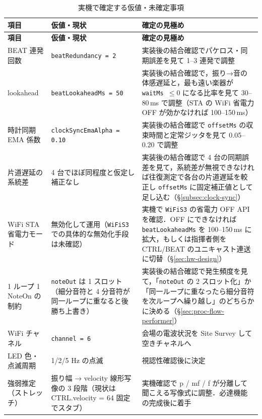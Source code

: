 \documentclass[lualatex,book,paper=a4paper,jafontsize=11.5pt,jafontscale=1.05]{jlreq}
\begin{document}
\begin{longtable}{L{0.18\textwidth} L{0.34\textwidth} L{0.40\textwidth}}
\caption{実機で確定する仮値・未確定事項}\label{tab:tbd}\\
\toprule
\textbf{項目} & \textbf{仮値・現状} & \textbf{確定の見極め} \\
\midrule
\endfirsthead
\toprule
\textbf{項目} & \textbf{仮値・現状} & \textbf{確定の見極め} \\
\midrule
\endhead
BEAT 連発回数            & \texttt{beatRedundancy = 2}                & 実装後の結合確認でパケロス・同期誤差を見て 1--3 連発で調整 \\
lookahead                & \texttt{beatLookaheadMs = 50}              & 実装後の結合確認で，振り→音の体感遅延と，最も遠い楽器が \texttt{waitMs $\leq 0$} になる比率を見て 30--80\,ms で調整（STA の WiFi 省電力 OFF が効かなければ 100--150\,ms） \\
時計同期 EMA 係数        & \texttt{clockSyncEmaAlpha = 0.10}          & 実装後の結合確認で \texttt{offsetMs} の収束時間と定常ジッタを見て 0.05--0.20 で調整 \\
片道遅延の系統差          & 4 台でほぼ同程度と仮定し補正なし           & 実装後の結合確認で 4 台の同期誤差を見て，系統差が無視できなければ往復測定で各台の片道遅延を較正し \texttt{offsetMs} に固定補正値として足し込む（\S\ref{subsec:clock-sync}） \\
WiFi STA 省電力モード     & 無効化して運用（\texttt{WiFiS3} での具体的な無効化手段は未確認） & 実機で \texttt{WiFiS3} の省電力 OFF API を確認．OFF にできなければ \texttt{beatLookaheadMs} を 100--150\,ms に拡大，もしくは指揮者側を CTRL/BEAT のユニキャスト連送に切替（\S\ref{sec:hw-design}） \\
1 ループ 1 NoteOn の制約  & \texttt{noteOut} は 1 スロット（細分音符と 4 分音符が同一ループに重なると後勝ち上書き） & 実装後の結合確認で発生頻度を見て，「\texttt{noteOut} の 2 スロット化」か「同一ループに重なったら細分音符を次ループへ繰り越し」のどちらかに決める（\S\ref{sec:proc-flow-performer}） \\
WiFi チャネル            & \texttt{channel = 6}                       & 会場の電波状況を Site Survey して空きチャネルへ \\
LED 色・点滅周期         & 1/2/5 Hz の点滅                            & 視認性確認後に決定 \\
強弱推定（ストレッチ）    & 振り幅 → velocity 線形写像の 3 段階（現状は CTRL.velocity = 64 固定でスタブ） & 実機確認で p / mf / f が分離して聞こえる写像式に調整．必達機能の完成後に着手 \\

\end{longtable}
\end{document}
